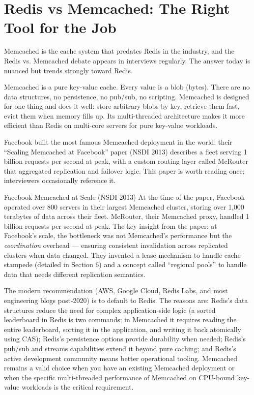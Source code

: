 \documentclass[11pt,a4paper]{article}
\begin{document}
\section{Redis vs Memcached: The Right Tool for the Job}

Memcached is the cache system that predates Redis in the industry, and the Redis vs. Memcached debate appears in interviews regularly. The answer today is nuanced but trends strongly toward Redis.

Memcached is a pure key-value cache. Every value is a blob (bytes). There are no data structures, no persistence, no pub/sub, no scripting. Memcached is designed for one thing and does it well: store arbitrary blobs by key, retrieve them fast, evict them when memory fills up. Its multi-threaded architecture makes it more efficient than Redis on multi-core servers for pure key-value workloads.

Facebook built the most famous Memcached deployment in the world: their ``Scaling Memcached at Facebook'' paper (NSDI 2013) describes a fleet serving 1 billion requests per second at peak, with a custom routing layer called McRouter that aggregated replication and failover logic. This paper is worth reading once; interviewers occasionally reference it.

\begin{industrybox}{Facebook Memcached at Scale (NSDI 2013)}
At the time of the paper, Facebook operated over 800 servers in their largest Memcached cluster, storing over 1,000 terabytes of data across their fleet. McRouter, their Memcached proxy, handled 1 billion requests per second at peak. The key insight from the paper: at Facebook's scale, the bottleneck was not Memcached's performance but the \emph{coordination} overhead --- ensuring consistent invalidation across replicated clusters when data changed. They invented a lease mechanism to handle cache stampede (detailed in Section 6) and a concept called ``regional pools'' to handle data that needs different replication semantics.
\end{industrybox}

The modern recommendation (AWS, Google Cloud, Redis Labs, and most engineering blogs post-2020) is to default to Redis. The reasons are: Redis's data structures reduce the need for complex application-side logic (a sorted leaderboard in Redis is two commands; in Memcached it requires reading the entire leaderboard, sorting it in the application, and writing it back atomically using CAS); Redis's persistence options provide durability when needed; Redis's pub/sub and streams capabilities extend it beyond pure caching; and Redis's active development community means better operational tooling. Memcached remains a valid choice when you have an existing Memcached deployment or when the specific multi-threaded performance of Memcached on CPU-bound key-value workloads is the critical requirement.
\end{document}
